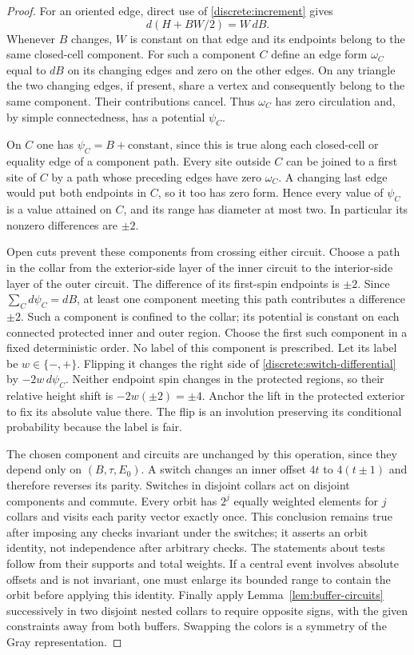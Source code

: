 \documentclass[11pt]{article}
\theoremstyle{definition}
\theoremstyle{remark}
\numberwithin{equation}{section}
\begin{document}
\begin{proof}
For an oriented edge, direct use of \eqref{discrete:increment} gives
\begin{equation}\label{discrete:switch-differential}
 d(H+BW/2)=W\,dB.
\end{equation}
Whenever $B$ changes, $W$ is constant on that edge and its endpoints
belong to the same closed-cell component. For such a component $C$ define
an edge form $\omega_C$ equal to $dB$ on its changing edges and zero on
the other edges. On any triangle the two changing edges, if present,
share a vertex and consequently belong to the same component. Their
contributions cancel. Thus $\omega_C$ has zero circulation and, by simple
connectedness, has a potential $\psi_C$.

On $C$ one has $\psi_C=B+\text{constant}$, since this is true along each
closed-cell or equality edge of a component path. Every site outside $C$
can be joined to a first site of $C$ by a path whose preceding edges have
zero $\omega_C$. A changing last edge would put both endpoints in $C$,
so it too has zero form. Hence every value of $\psi_C$ is a value attained
on $C$, and its range has diameter at most two. In particular its
nonzero differences are $\pm2$.

Open cuts prevent these components from crossing either circuit. Choose
a path in the collar from the exterior-side layer of the inner circuit
to the interior-side layer of the outer circuit. The difference of its
first-spin endpoints is $\pm2$. Since
$\sum_Cd\psi_C=dB$, at least one component meeting this path contributes
a difference $\pm2$. Such a component is confined to the collar; its
potential is constant on each connected protected inner and outer
region. Choose the first such component in a fixed deterministic order.
No label of this component is prescribed. Let its label be $w\in\{-,+\}$.
Flipping it changes the right side of
\eqref{discrete:switch-differential} by $-2w\,d\psi_C$. Neither endpoint
spin changes in the protected regions, so their relative height shift is
$-2w(\pm2)=\pm4$. Anchor the lift in the protected exterior to fix its
absolute value there. The flip is an involution preserving its
conditional probability because the label is fair.

The chosen component and circuits are unchanged by this operation,
since they depend only on $(B,\tau,E_0)$. A switch changes an inner
offset $4t$ to $4(t\pm1)$ and therefore reverses its parity. Switches in
disjoint collars act on disjoint components and commute. Every orbit
has $2^j$ equally weighted elements for $j$ collars and visits each
parity vector exactly once. This conclusion remains true after imposing
any checks invariant under the switches; it asserts an orbit identity,
not independence after arbitrary checks. The statements about tests
follow from their supports and total weights. If a central event involves
absolute offsets and is not invariant, one must enlarge its bounded
range to contain the orbit before applying this identity. Finally apply
Lemma~\ref{lem:buffer-circuits} successively in two disjoint nested
collars to require opposite signs, with the given constraints away from
both buffers. Swapping the colors is a symmetry of the Gray representation.
\end{proof}
\end{document}

